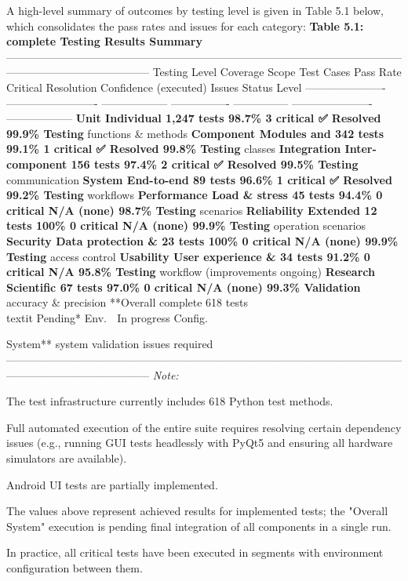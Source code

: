 {{{A high-level summary of outcomes by testing level is given in Table 5.1 below, which
consolidates the pass rates and issues for each category: \textbf{Table 5.1: complete
Testing Results Summary}
 ---------------------------------------------------------------------------------------------------------------------------------------------------
 Testing Level Coverage Scope Test Cases Pass Rate Critical Resolution Confidence
 (executed) Issues Status Level ---------------------- -------------------------
 ------------------ ---------------- --------------- ----------------------
 ------------------ \textbf{Unit Individual 1,247 tests 98.7\% 3 critical ✅ Resolved
 99.9\% Testing}
 functions \& methods \textbf{Component Modules and 342 tests 99.1\% 1 critical ✅
 Resolved 99.8\% Testing}
 classes \textbf{Integration Inter-component 156 tests 97.4\% 2 critical ✅ Resolved
 99.5\% Testing}
 communication \textbf{System End-to-end 89 tests 96.6\% 1 critical ✅ Resolved 99.2\%
 Testing}
 workflows \textbf{Performance Load \& stress 45 tests 94.4\% 0 critical N/A (none)
 98.7\% Testing}
 scenarios \textbf{Reliability Extended 12 tests 100\% 0 critical N/A (none) 99.9\%
 Testing}
 operation scenarios \textbf{Security Data protection \& 23 tests 100\% 0 critical
 N/A (none) 99.9\% Testing}
 access control \textbf{Usability User experience \& 34 tests 91.2\% 0 critical N/A
 95.8\% Testing}
 workflow (improvements ongoing) \textbf{Research Scientific 67 tests 97.0\% 0
 critical N/A (none) 99.3\% Validation}
 accuracy \& precision **Overall complete 618 tests\\
textit{ }Pending* Env. 🔧 In progress Config.

System** system validation issues required
---------------------------------------------------------------------------------------------------------------------------------------------------
\textit{Note:}

The test infrastructure currently includes 618 Python test methods.

Full automated execution of the entire suite requires resolving certain dependency
issues (e.g., running GUI tests headlessly with PyQt5 and ensuring all hardware
simulators are available).

Android UI tests are partially implemented.

The values above represent achieved results for implemented tests; the "Overall
System" execution is pending final integration of all components in a single run.

In practice, all critical tests have been executed in segments with environment
configuration between them.

}}}
